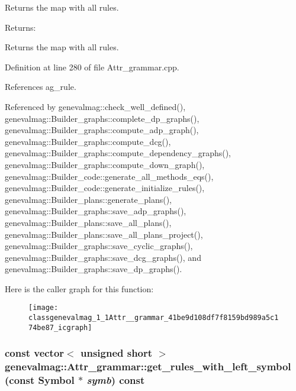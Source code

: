Returns the map with all rules. \begin{Desc}
\item[Returns:]\end{Desc}
Returns the map with all rules. 

Definition at line 280 of file Attr\_\-grammar.cpp.

References ag\_\-rule.

Referenced by genevalmag::check\_\-well\_\-defined(), genevalmag::Builder\_\-graphs::complete\_\-dp\_\-graphs(), genevalmag::Builder\_\-graphs::compute\_\-adp\_\-graph(), genevalmag::Builder\_\-graphs::compute\_\-dcg(), genevalmag::Builder\_\-graphs::compute\_\-dependency\_\-graphs(), genevalmag::Builder\_\-graphs::compute\_\-down\_\-graph(), genevalmag::Builder\_\-code::generate\_\-all\_\-methods\_\-eqs(), genevalmag::Builder\_\-code::generate\_\-initialize\_\-rules(), genevalmag::Builder\_\-plans::generate\_\-plans(), genevalmag::Builder\_\-graphs::save\_\-adp\_\-graphs(), genevalmag::Builder\_\-plans::save\_\-all\_\-plans(), genevalmag::Builder\_\-plans::save\_\-all\_\-plans\_\-project(), genevalmag::Builder\_\-graphs::save\_\-cyclic\_\-graphs(), genevalmag::Builder\_\-graphs::save\_\-dcg\_\-graphs(), and genevalmag::Builder\_\-graphs::save\_\-dp\_\-graphs().

Here is the caller graph for this function:\nopagebreak
\begin{figure}[H]
\begin{center}
\leavevmode
\texttt{[image: classgenevalmag\_1\_1Attr\_\_grammar\_41be9d108df7f8159bd989a5c174be87\_icgraph]}
\end{center}
\end{figure}
\hypertarget{classgenevalmag_1_1Attr__grammar_0f88798aa739681bf39c2620b1f39069}{
\subsubsection[{get\_\-rules\_\-with\_\-left\_\-symbol}]{\setlength{\rightskip}{0pt plus 5cm}const vector$<$ unsigned short $>$ genevalmag::Attr\_\-grammar::get\_\-rules\_\-with\_\-left\_\-symbol (const {\bf Symbol} $\ast$ {\em symb}) const}}
\label{classgenevalmag_1_1Attr__grammar_0f88798aa739681bf39c2620b1f39069}


